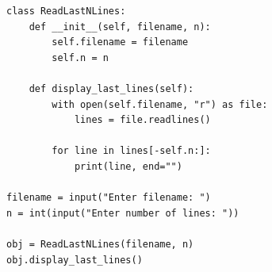 \begin{verbatim}
class ReadLastNLines:
    def __init__(self, filename, n):
        self.filename = filename
        self.n = n

    def display_last_lines(self):
        with open(self.filename, "r") as file:
            lines = file.readlines()

        for line in lines[-self.n:]:
            print(line, end="")

filename = input("Enter filename: ")
n = int(input("Enter number of lines: "))

obj = ReadLastNLines(filename, n)
obj.display_last_lines()
\end{verbatim}